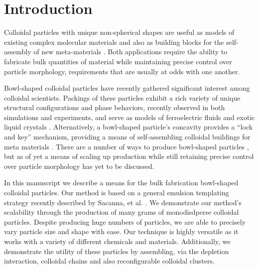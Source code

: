 \documentclass[aps,pre,preprint,superscriptaddress,nofootinbib]{revtex4-1}
\begin{document}

\section{Introduction}



Colloidal particles with unique non-spherical shapes are useful as models of existing complex molecular materials and also as building blocks for the self-assembly of new meta-materials \cite{Marechal2010Phase, Marechal2010Phase2, Edmond2012Decoupling, Sacanna2013Engineering}.
Both applications require the ability to fabricate bulk quantities of material while maintaining precise control over particle morphology, requirements that are usually at odds with one another.

Bowl-shaped colloidal particles have recently gathered significant interest among colloidal scientists.
Packings of these particles exhibit a rich variety of unique structural configurations and phase behaviors, recently observed in both simulations and experiments, and serve as models of ferroelectric fluids and exotic liquid crystals \cite{Marechal2010Phase, Marechal2010Phase2, Zoldesi2006Deformable, Cinacchi2010Phase, Cinacchi2013Phase}.
Alternatively, a bowl-shaped particle's concavity provides a ``lock and key'' mechanism, providing a means of self-assembling colloidal buildings for meta materials \cite{Sacanna2010Lock, Sacanna2013Shaping, Sacanna2013Engineering}.
There are a number of ways to produce bowl-shaped particles \cite{Zoldesi2006Deformable, Sacanna2013Shaping, Wang2002Seeded}, but as of yet a means of scaling up production while still retaining precise control over particle morphology has yet to be discussed.

In this manuscript we describe a means for the bulk fabrication bowl-shaped colloidal particles.
Our method is based on a general emulsion templating strategy recently described by Sacanna, et al. \cite{Sacanna2013Shaping}.
We demonstrate our method's scalability through the production of many grams of monodisdperse colloidal particles.
Despite producing huge numbers of particles, we are able to precisely vary particle size and shape with ease.
Our technique is highly versatile as it works with a variety of different chemicals and materials.
Additionally, we demonstrate the utility of these particles by assembling, via the depletion interaction, colloidal chains and also reconfigurable colloidal clusters.
\end{document}
